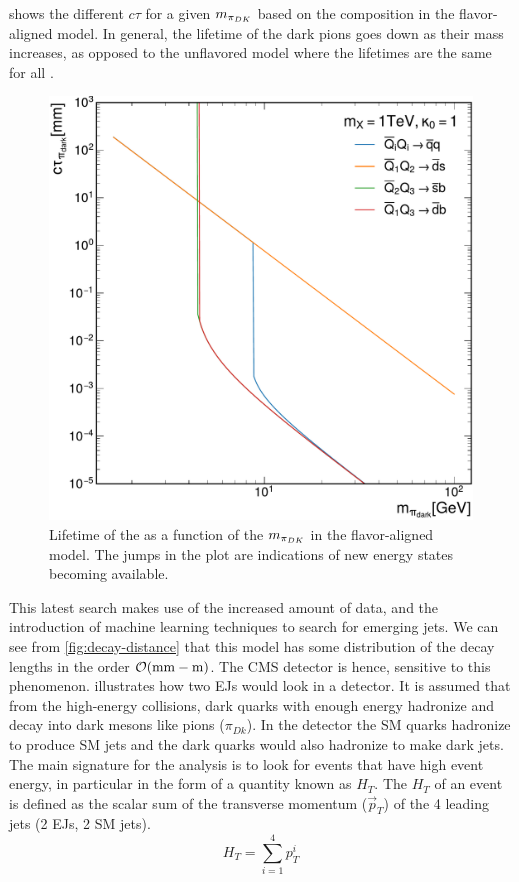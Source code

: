  shows the different $c\tau$ for a given $m_{\pi_{DK}}$ based on the \pidark composition in the flavor-aligned model. In general, the lifetime of the dark pions goes down as their mass increases, as opposed to the unflavored model where the lifetimes are the same for all \pidark.
\begin{figure}[b]
	\centering
	\includegraphics[width=.65\linewidth]{Images/pdfs/FlavoredLifetime.pdf}
	\caption[Lifetimes of the dark pions as a function of their mass.]{Lifetime of the \pidark as a function of the $m_{\pi_{DK}}$ in the flavor-aligned model. The jumps in the plot are indications of new energy states becoming available.}
	\label{fig:lifetimes}
\end{figure}

This latest search makes use of the increased amount of data, and the introduction of machine learning techniques to search for emerging jets.
We can see from \cref{fig:decay-distance} that this model has some distribution of the decay lengths in the order $\order{\unit{mm} - \unit{m}}$. The CMS detector is hence, sensitive to this phenomenon.
 illustrates how two EJs would look in a detector. It is assumed that from the high-energy collisions, dark quarks with enough energy hadronize and decay into dark mesons like pions ($\pi_{Dk}$). In the detector the SM quarks hadronize to produce SM jets and the dark quarks would also hadronize to make dark jets. The main signature for the analysis is to look for events that have high event energy, in particular in the form of a quantity known as $H_T$. The $H_T$ of an event is defined as the scalar sum of the transverse momentum ($\Vec{p}_T$) of the 4 leading jets (2 EJs, 2 SM jets).
\begin{equation}
	H_T = \sum_{i=1}^4 p_T^i
\end{equation}

